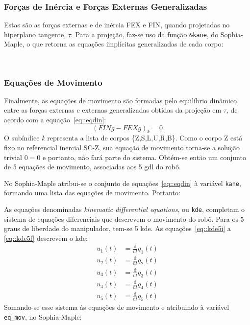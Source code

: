 		 
\subsubsection{Forças de Inércia e  Forças Externas Generalizadas}

Estas são as forças externas e de inércia FEX e FIN, quando projetadas no
hiperplano tangente, $\tau$. Para a projeção, faz-se uso da função
\texttt{\&kane}, do Sophia-Maple, o que retorna as equações implícitas
generalizadas de cada corpo:

\bigskip {} \\
		 
\subsubsection{Equações de Movimento}

Finalmente, as equações de movimento são formadas pelo equilíbrio dinâmico entre
as forças externas e externas generalizadas obtidas da projeção em $\tau$, de
acordo com a equação~\ref{eq::eqdin}:
%
\begin{equation}
	(FINg - FEXg)_{k} = 0 \label{eq::eqdin}
\end{equation}
%
O subíndice \textit{k} representa a lista de corpos \{Z,S,L,U,R,B\}. Como o
corpo Z está fixo no referencial inercial SC-Z, sua equação de movimento
torna-se a solução trivial $0=0$ e portanto, não fará parte do sistema. Obtém-se
então um conjunto de 5 equações de movimento, associadas aos 5 gdl do robô.

No Sophia-Maple atribui-se o conjunto de equações~\ref{eq::eqdin} à
variável \texttt{kane}, formando uma lista das equações de movimento. Portanto:

\bigskip {} \bigskip

As equações denominadas \textit{kinematic differential equations}, ou
\texttt{kde}, completam o sistema de equações diferenciais que descrevem o
movimento do robô.
Para os 5 graus de liberdade do manipulador, tem-se 5 kde. As
equações~\ref{eq::kde5i} a \ref{eq::kde5f} descrevem o kde:
%
\begin{align}
	u_{1}(t) &= \frac{\mathrm{d} }{\mathrm{d} t}q_{1}(t) \label{eq::kde5i} \\
	u_{2}(t) &= \frac{\mathrm{d} }{\mathrm{d} t}q_{2}(t) \\
	u_{3}(t) &= \frac{\mathrm{d} }{\mathrm{d} t}q_{3}(t)
\end{align}
%
\begin{align}	
	u_{4}(t) &= \frac{\mathrm{d} }{\mathrm{d} t}q_{4}(t) \\
	u_{5}(t) &= \frac{\mathrm{d} }{\mathrm{d} t}q_{5}(t) \label{eq::kde5f}	
\end{align}
Somando-se esse sistema às equações de movimento e atribuindo à variável
\texttt{eq\_mov}, no Sophia-Maple:

